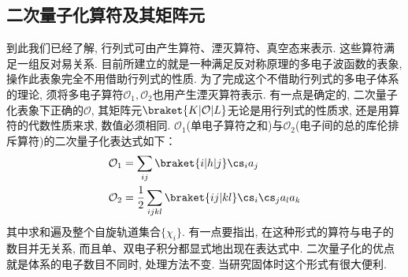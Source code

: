 \subsection{二次量子化算符及其矩阵元}
\label{sec2.4.2}
到此我们已经了解, 
行列式可由产生算符、湮灭算符、真空态来表示. 
这些算符满足一组反对易关系. 
目前所建立的就是一种满足反对称原理的多电子波函数的表象, 
操作此表象完全不用借助行列式的性质. 
为了完成这个不借助行列式的多电子体系的理论, 
须将多电子算符$\mathcal{O}_1,\mathcal{O}_2$也用产生湮灭算符表示. 
有一点是确定的, 
二次量子化表象下正确的$\mathcal{O}$, 
其矩阵元$\braket{K|\mathcal{O}|L}$无论是用行列式的性质求, 
还是用算符的代数性质来求, 
数值必须相同. 
$\mathcal{O}_1$(单电子算符之和)与$\mathcal{O}_2$(电子间的总的库伦排斥算符)的二次量子化表达式如下：
\begin{align}
\mathcal{O}_1 & = \sum_{ij} \braket{i|h|j}\cs_ia_j\\
\mathcal{O}_2 & = \frac{1}{2}\sum_{ijkl}\braket{ij|kl}\cs_i\cs_ja_la_k
\end{align}
其中求和遍及整个自旋轨道集合$\{\chi_i\}$. 
有一点要指出, 
在这种形式的算符与电子的数目并无关系, 
而且单、双电子积分都显式地出现在表达式中. 
二次量子化的优点就是体系的电子数目不同时, 
处理方法不变. 
当研究固体时这个形式有很大便利.

